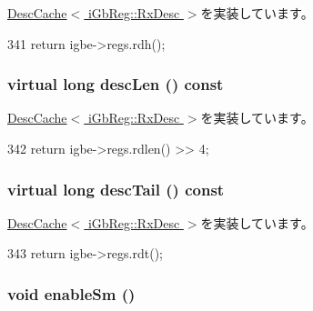 \hyperlink{classIGbE_1_1DescCache_af413050780b6b8b2fe0793fff12037e3}{DescCache$<$ iGbReg::RxDesc $>$}を実装しています。


\begin{DoxyCode}
341 { return igbe->regs.rdh(); }
\end{DoxyCode}
\hypertarget{classIGbE_1_1RxDescCache_a465e4e31be3a89db3d7f9cd1ecc40064}{
\subsubsection[{descLen}]{\setlength{\rightskip}{0pt plus 5cm}virtual long descLen () const}}
\label{classIGbE_1_1RxDescCache_a465e4e31be3a89db3d7f9cd1ecc40064}


\hyperlink{classIGbE_1_1DescCache_a8eb35163568b01fa17aa47b23a80f90c}{DescCache$<$ iGbReg::RxDesc $>$}を実装しています。


\begin{DoxyCode}
342 { return igbe->regs.rdlen() >> 4; }
\end{DoxyCode}
\hypertarget{classIGbE_1_1RxDescCache_a4b6b769be62592fc43518ba480bbd1f7}{
\subsubsection[{descTail}]{\setlength{\rightskip}{0pt plus 5cm}virtual long descTail () const}}
\label{classIGbE_1_1RxDescCache_a4b6b769be62592fc43518ba480bbd1f7}


\hyperlink{classIGbE_1_1DescCache_a88ebc5d9eb88ca9148465557e9a66c1c}{DescCache$<$ iGbReg::RxDesc $>$}を実装しています。


\begin{DoxyCode}
343 { return igbe->regs.rdt(); }
\end{DoxyCode}
\hypertarget{classIGbE_1_1RxDescCache_aec7fdcc540223076999e0f8f07f854bc}{
\subsubsection[{enableSm}]{\setlength{\rightskip}{0pt plus 5cm}void enableSm ()}}
\label{classIGbE_1_1RxDescCache_aec7fdcc540223076999e0f8f07f854bc}


